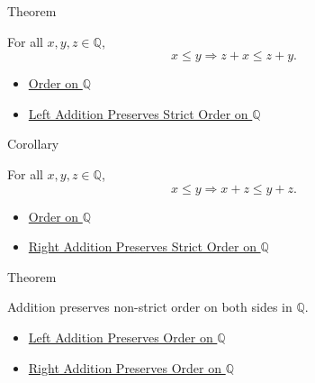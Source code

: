 \begin{theorembox}{Theorem}
\begin{theorem}
\label{thm:left-addition-preserves-order-on-q}
For all $x,y,z\in\mathbb{Q}$,
\[
x\le y \Longrightarrow z+x\le z+y.
\]
\end{theorem}
\end{theorembox}

\begin{dependencies}
\begin{itemize}
  \item \hyperref[def:order-on-q]{Order on $\mathbb{Q}$}
  \item \hyperref[thm:left-addition-preserves-strict-order-on-q]{Left Addition Preserves Strict Order on $\mathbb{Q}$}
\end{itemize}
\end{dependencies}

\begin{corollarybox}{Corollary}
\begin{corollary}
\label{cor:right-addition-preserves-order-on-q}
For all $x,y,z\in\mathbb{Q}$,
\[
x\le y \Longrightarrow x+z\le y+z.
\]
\end{corollary}
\end{corollarybox}

\begin{dependencies}
\begin{itemize}
  \item \hyperref[def:order-on-q]{Order on $\mathbb{Q}$}
  \item \hyperref[cor:right-addition-preserves-strict-order-on-q]{Right Addition Preserves Strict Order on $\mathbb{Q}$}
\end{itemize}
\end{dependencies}

\begin{theorembox}{Theorem}
\begin{theorem}
\label{thm:addition-preserves-order-on-q}
Addition preserves non-strict order on both sides in $\mathbb{Q}$.
\end{theorem}
\end{theorembox}

\begin{dependencies}
\begin{itemize}
  \item \hyperref[thm:left-addition-preserves-order-on-q]{Left Addition Preserves Order on $\mathbb{Q}$}
  \item \hyperref[cor:right-addition-preserves-order-on-q]{Right Addition Preserves Order on $\mathbb{Q}$}
\end{itemize}
\end{dependencies}

